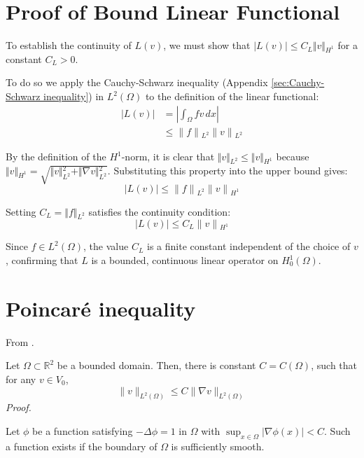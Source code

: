 \documentclass[conference]{IEEEtran}
\begin{document}
\section{Proof of Bound Linear Functional} \label{sec:proof of bound}

To establish the continuity of $L(v)$, we must show that $\vert{}L(v)\vert{} \le C_L \Vert{}v\Vert{}_{H^1}$ for a constant $C_L > 0$. 

To do so we apply the Cauchy-Schwarz inequality (Appendix \ref{sec:Cauchy-Schwarz inequality}) in $L^2(\Omega)$ to the definition of the linear functional:
\begin{equation}
\begin{aligned}
    |L(v)| &= \left|\int _{\Omega }fv\,dx\right| \\
    &\le \|f\|{}_{L^{2}}\|v\|{}_{L^{2}}
\end{aligned}
\end{equation}

By the definition of the $H^{1}$-norm, it is clear that $\Vert{}v\Vert{}_{L^2} \le \Vert{}v\Vert{}_{H^1}$ because $\Vert{}v\Vert{}_{H^1} = \sqrt{\Vert{}v\Vert{}_{L^2}^2 + \Vert{}\nabla v\Vert{}_{L^2}^2}$. Substituting this property into the upper bound gives:
\begin{equation}
    |L(v)| \le \|f\|{}_{L^{2}}\|v\|{}_{H^{1}}
\end{equation}

Setting \(C_L = \Vert{}f\Vert{}_{L^2}\) satisfies the continuity condition:
\begin{equation}
    |L(v)|\le C_{L}\|v\|{}_{H^{1}}
\end{equation}

Since $f \in L^2(\Omega)$, the value $C_{L}$ is a finite constant independent of the choice of $v$, confirming that $L$ is a bounded, continuous linear operator on $H^1_0(\Omega)$.


\section{Poincaré inequality} \label{sec:Poincaré inequality}
From \cite{b10}. 

Let $\Omega \subset \mathbb{R}^2$ be a bounded domain. Then, there is constant $C = C(\Omega)$, such that for any $v \in V_0$,
\begin{equation}
    \|v\|_{L^2(\Omega)} \leq C\|\nabla v\|_{L^2(\Omega)}
\end{equation}
\textit{Proof.}

Let $\phi$ be a function satisfying $-\Delta\phi = 1$ in $\Omega$ with $\sup_{x\in \Omega}\Big|\nabla \phi(x)\Big| < C$. Such a function exists if the boundary of $\Omega$ is sufficiently smooth.
\end{document}
